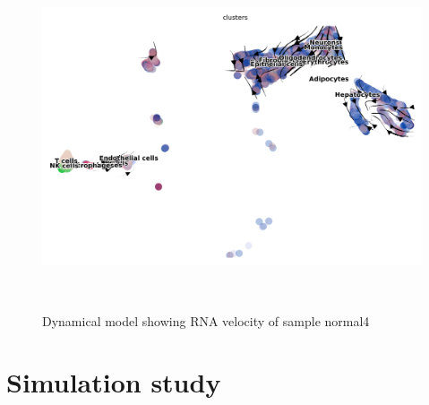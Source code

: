 \begin{figure}[!htb]
\begin{center}
\includegraphics[width=6in,height=4in]{../figures/kidney_mouse/normal4_dynamical_model.png}
\end{center}
\caption{Dynamical model showing RNA velocity of sample normal4} 
\label{fig:velocity_normal4}
\end{figure}
\FloatBarrier

\section{Simulation study}

